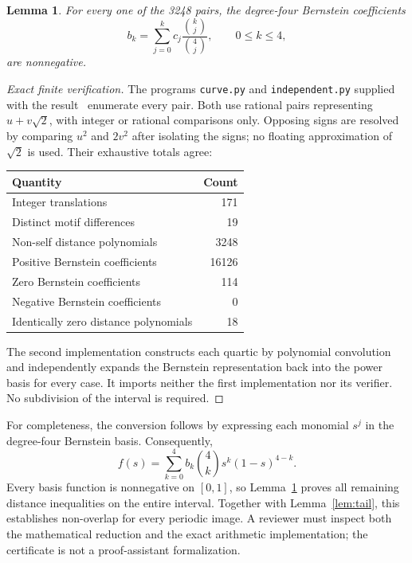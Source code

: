 \documentclass[11pt]{amsart}
\newtheorem{lemma}{Lemma}
\theoremstyle{remark}
\begin{document}
\begin{lemma}\label{lem:certificate}
For every one of the 3248 pairs, the degree-four Bernstein coefficients
\begin{equation}\label{eq:bernstein}
 b_k=\sum_{j=0}^k c_j\frac{\binom{k}{j}}{\binom{4}{j}},\qquad 0\le k\le4,
\end{equation}
are nonnegative.
\end{lemma}
\begin{proof}[Exact finite verification]
The programs \texttt{curve.py} and \texttt{independent.py} supplied with the result~\cite{Certificate} enumerate every pair. Both use rational pairs representing $u+v\sqrt2$, with integer or rational comparisons only. Opposing signs are resolved by comparing $u^2$ and $2v^2$ after isolating the signs; no floating approximation of $\sqrt2$ is used. Their exhaustive totals agree:
\begin{center}
\begin{tabular}{lr}
\toprule
Quantity & Count\\\midrule
Integer translations &171\\
Distinct motif differences &19\\
Non-self distance polynomials &3248\\
Positive Bernstein coefficients &16126\\
Zero Bernstein coefficients &114\\
Negative Bernstein coefficients &0\\
Identically zero distance polynomials &18\\\bottomrule
\end{tabular}
\end{center}
The second implementation constructs each quartic by polynomial convolution and independently expands the Bernstein representation back into the power basis for every case. It imports neither the first implementation nor its verifier. No subdivision of the interval is required.
\end{proof}

For completeness, the conversion follows by expressing each monomial $s^j$ in the degree-four Bernstein basis. Consequently,
\[
 f(s)=\sum_{k=0}^4 b_k\binom4k s^k(1-s)^{4-k}.
\]
Every basis function is nonnegative on $[0,1]$, so Lemma~\ref{lem:certificate} proves all remaining distance inequalities on the entire interval. Together with Lemma~\ref{lem:tail}, this establishes non-overlap for every periodic image. A reviewer must inspect both the mathematical reduction and the exact arithmetic implementation; the certificate is not a proof-assistant formalization.
\end{document}
